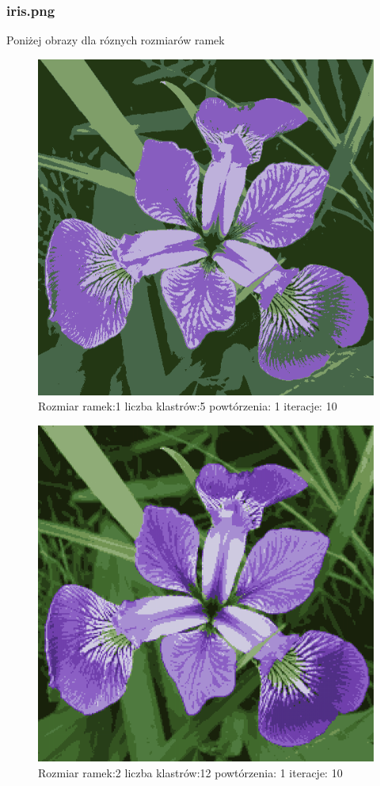 \documentclass{classrep}
\begin{document}
{{{                \subsubsection{iris.png}
                {

                    Poniżej obrazy dla róznych rozmiarów ramek
                    \begin{figure}[!htbp]
                        \centering
                        \includegraphics[width=\textwidth,width=90mm]{obrazy/iris_R1_K5_P1_It10.png}
                        \caption{Rozmiar ramek:1 liczba klastrów:5 powtórzenia: 1 iteracje: 10 }
                    \end{figure}

                    \begin{figure}[!htbp]
                        \centering
                        \includegraphics[width=\textwidth,width=90mm]{obrazy/iris_R2_K12_P1_It10.png}
                        \caption{Rozmiar ramek:2 liczba klastrów:12 powtórzenia: 1 iteracje: 10 }
                    \end{figure}

}}}}
\end{document}
